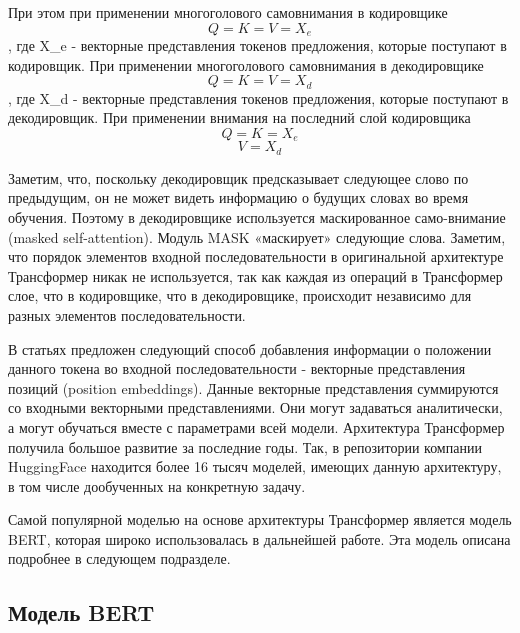 При этом при применении многоголового самовнимания в кодировщике
\begin{equation}
  Q = K = V = X_e
\end{equation},
где X\_e - векторные представления токенов предложения, которые поступают в кодировщик.
При применении многоголового самовнимания в декодировщике
\begin{equation}
  Q = K = V = X_d
\end{equation},
где X\_d - векторные представления токенов предложения, которые поступают в декодировщик.
При применении внимания на последний слой кодировщика
\begin{equation}
  Q = K = X_e
\end{equation}
\begin{equation}
  V = X_d
\end{equation}

 Заметим, что, поскольку декодировщик предсказывает следующее слово по предыдущим, он не может видеть информацию о будущих словах во время обучения. Поэтому в декодировщике используется маскированное само-внимание (masked self-attention). Модуль MASK «маскирует» следующие слова.
Заметим, что порядок элементов входной последовательности в оригинальной архитектуре Трансформер никак не используется, так как каждая из операций в Трансформер слое, что в кодировщике, что в декодировщике, происходит независимо для разных элементов последовательности. 

В статьях \cite{devlin_2018,gehring_2017,vaswani_2017} предложен следующий способ добавления информации о положении данного токена во входной последовательности - векторные представления позиций (position embeddings). Данные векторные представления суммируются со входными векторными представлениями. Они могут задаваться аналитически, а могут обучаться вместе с параметрами всей модели.
Архитектура Трансформер получила большое развитие за последние годы. Так, в репозитории компании HuggingFace \cite{na_website_ndaa} находится более 16 тысяч моделей, имеющих данную архитектуру, в том числе дообученных на конкретную задачу. 

Самой популярной моделью на основе архитектуры Трансформер является модель BERT, которая широко использовалась в дальнейшей работе. Эта модель описана подробнее в следующем подразделе. 

\subsection{Модель BERT}

